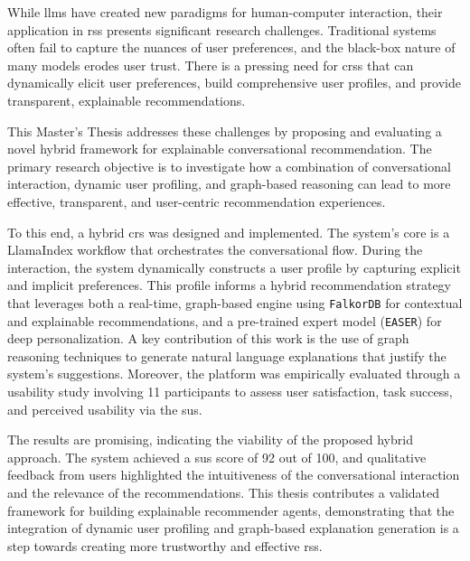 
While \acp{llm} have created new paradigms for human-computer interaction, their application in \acp{rs} presents significant research challenges. Traditional systems often fail to capture the nuances of user preferences, and the black-box nature of many models erodes user trust. There is a pressing need for \aclp{crs} that can dynamically elicit user preferences, build comprehensive user profiles, and provide transparent, explainable recommendations.

This Master's Thesis addresses these challenges by proposing and evaluating a novel hybrid framework for explainable conversational recommendation. The primary research objective is to investigate how a combination of conversational interaction, dynamic user profiling, and graph-based reasoning can lead to more effective, transparent, and user-centric recommendation experiences.

To this end, a hybrid \acl{crs} was designed and implemented. The system's core is a LlamaIndex workflow that orchestrates the conversational flow. During the interaction, the system dynamically constructs a user profile by capturing explicit and implicit preferences. This profile informs a hybrid recommendation strategy that leverages both a real-time, graph-based engine using \texttt{FalkorDB} for contextual and explainable recommendations, and a pre-trained expert model (\texttt{EASER}) for deep personalization. A key contribution of this work is the use of graph reasoning techniques to generate natural language explanations that justify the system's suggestions. Moreover, the platform was empirically evaluated through a usability study involving 11 participants to assess user satisfaction, task success, and perceived usability via the \ac{sus}.

The results are promising, indicating the viability of the proposed hybrid approach. The system achieved a \acs{sus} score of 92 out of 100, and qualitative feedback from users highlighted the intuitiveness of the conversational interaction and the relevance of the recommendations. This thesis contributes a validated framework for building explainable recommender agents, demonstrating that the integration of dynamic user profiling and graph-based explanation generation is a step towards creating more trustworthy and effective \aclp{rs}.

